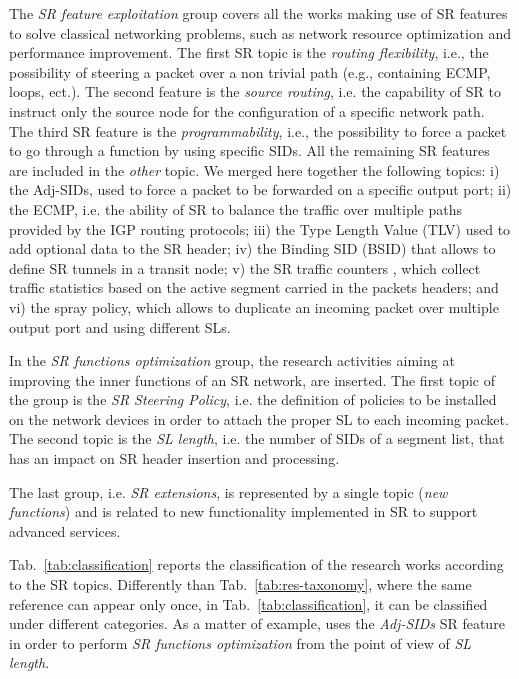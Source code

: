 The \emph{SR feature exploitation} group covers all the works making use of SR features to solve classical networking problems, such as network resource optimization and performance improvement. The first SR topic is the \emph{routing flexibility}, i.e., the possibility of steering a packet over a non trivial path (e.g., containing ECMP, loops, ect.).
The second feature is the \emph{source routing}, i.e. the capability of SR to instruct only the source node for the configuration of a specific network path.
The third SR feature is the \emph{programmability}, i.e., the possibility to force a packet to go through a function by using specific SIDs.
All the remaining SR features are included in the \emph{other} topic.
We merged here together the following topics: i) the Adj-SIDs, used to force a packet to be forwarded on a specific output port; ii) the ECMP, i.e. the ability of SR to balance the traffic over multiple paths provided by the IGP routing protocols; iii) the Type Length Value (TLV) used to add optional data to the SR header; iv) the Binding SID (BSID) that allows to define SR tunnels in a transit node; v) the SR traffic counters , which collect traffic statistics based on the active segment carried in the packets headers; and vi) the spray policy, which allows to duplicate an incoming packet over multiple output port and using different SLs. 

In the \emph{SR functions optimization} group, the research activities aiming at improving the inner functions of an SR network, are inserted.
The first topic of the group is the \emph{SR Steering Policy}, i.e. the definition of policies to be installed on the network devices in order to attach the proper SL to each incoming packet. The second topic is  the \emph{SL length}, i.e. the number of SIDs of a segment list, that has an impact on SR header insertion and processing.

The last group, i.e. \emph{SR extensions}, is represented by a single topic (\emph{new functions}) and is related to new functionality implemented in SR to support advanced services.

Tab.~\ref{tab:classification} reports the classification of the research works according to the SR topics. Differently than Tab.~\ref{tab:res-taxonomy}, where the same reference can appear only once, in Tab.~\ref{tab:classification}, it can be classified under different categories. As a matter of example, \cite{translating} uses the \emph{Adj-SIDs} SR feature in order to perform \emph{SR functions optimization} from the point of view of \emph{SL length}.


